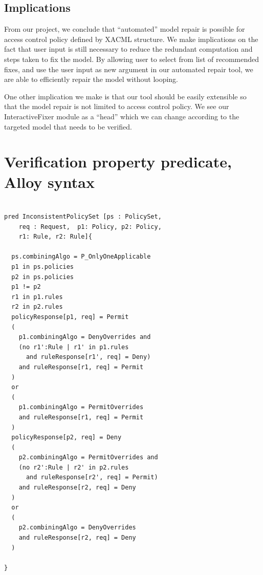 \documentclass{acm_proc_article-sp}
\begin{document}
\subsection{Implications}

From our project, we conclude that ``automated'' model repair is possible for access control policy defined by XACML structure. We make implications on the fact that user input is still necessary to reduce the redundant computation and steps taken to fix the model. By allowing user to select from list of recommended fixes, and use the user input as new argument in our automated repair tool, we are able to efficiently repair the model without looping.

One other implication we make is that our tool should be easily extensible so that the model repair is not limited to access control policy. We see our InteractiveFixer module as a ``head'' which we can change according to the targeted model that needs to be verified. 


{}


\appendix
\section{Verification property predicate, Alloy syntax} \label{A}

\begin{verbatim}

pred InconsistentPolicySet [ps : PolicySet, 
    req : Request,  p1: Policy, p2: Policy, 
    r1: Rule, r2: Rule]{

  ps.combiningAlgo = P_OnlyOneApplicable 
  p1 in ps.policies
  p2 in ps.policies
  p1 != p2
  r1 in p1.rules
  r2 in p2.rules
  policyResponse[p1, req] = Permit
  (
    p1.combiningAlgo = DenyOverrides and
    (no r1':Rule | r1' in p1.rules 
      and ruleResponse[r1', req] = Deny)
    and ruleResponse[r1, req] = Permit
  )
  or
  (
    p1.combiningAlgo = PermitOverrides
    and ruleResponse[r1, req] = Permit
  )
  policyResponse[p2, req] = Deny
  (
    p2.combiningAlgo = PermitOverrides and
    (no r2':Rule | r2' in p2.rules 
      and ruleResponse[r2', req] = Permit)
    and ruleResponse[r2, req] = Deny
  )
  or
  (
    p2.combiningAlgo = DenyOverrides
    and ruleResponse[r2, req] = Deny
  )

}

\end{verbatim}



\balancecolumns
\end{document}

